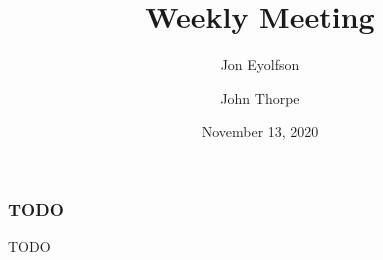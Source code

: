 

\title{Weekly Meeting}
\date{November 13, 2020}
\author{Jon Eyolfson \and John Thorpe}



  \begin{frame}[plain]
    \titlepage
  \end{frame}

  \setcounter{framenumber}{0}

  \begin{frame}
    \frametitle{TODO}

    TODO

  \end{frame}


